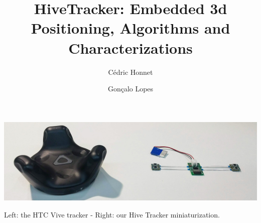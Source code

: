 \documentclass[sigchi]{acmart}
\begin{document}
\title{HiveTracker: Embedded 3d Positioning, Algorithms and Characterizations}

\author{C\'edric Honnet}

\author{Gon\c{c}alo Lopes}

\begin{teaserfigure}
\centering
\includegraphics[width=1.0\columnwidth]{Figures/banner.jpg}
\caption{Left: the HTC Vive tracker - Right: our Hive Tracker miniaturization.}
\label{Fig:Banner}
\end{teaserfigure}

\end{document}
